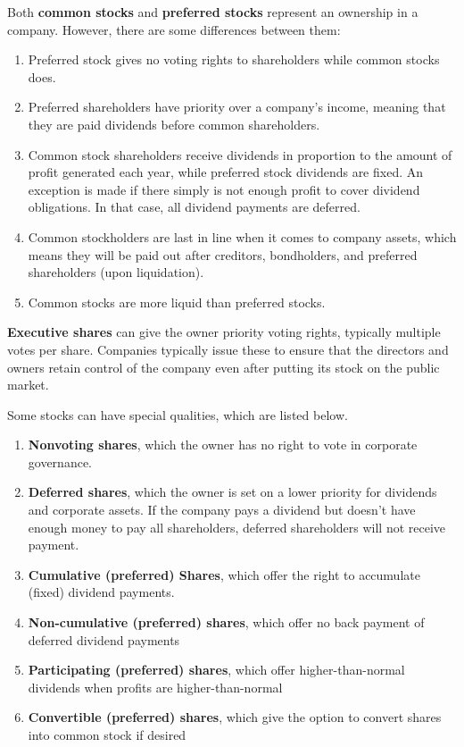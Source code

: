 \documentclass{article}
\begin{document}
  \begin{definition}
    Both \textbf{common stocks} and \textbf{preferred stocks} represent an ownership in a company. However, there are some differences between them: 
    \begin{enumerate}
      \item Preferred stock gives no voting rights to shareholders while common stocks does. 
      \item Preferred shareholders have priority over a company's income, meaning that they are paid dividends before common shareholders. 
      \item Common stock shareholders receive dividends in proportion to the amount of profit generated each year, while preferred stock dividends are fixed. An exception is made if there simply is not enough profit to cover dividend obligations. In that case, all dividend payments are deferred. 
      \item Common stockholders are last in line when it comes to company assets, which means they will be paid out after creditors, bondholders, and preferred shareholders (upon liquidation). 
      \item Common stocks are more liquid than preferred stocks. 
    \end{enumerate}
    \textbf{Executive shares} can give the owner priority voting rights, typically multiple votes per share. Companies typically issue these to ensure that the directors and owners retain control of the company even after putting its stock on the public market. 
  \end{definition}

  Some stocks can have special qualities, which are listed below. 
  \begin{enumerate}
    \item \textbf{Nonvoting shares}, which the owner has no right to vote in corporate governance. 
    \item \textbf{Deferred shares}, which the owner is set on a lower priority for dividends and corporate assets. If the company pays a dividend but doesn’t have enough money to pay all shareholders, deferred shareholders will not receive payment. 
    \item \textbf{Cumulative (preferred) Shares}, which offer the right to accumulate (fixed) dividend payments. 
    \item \textbf{Non-cumulative (preferred) shares}, which offer no back payment of deferred dividend payments
    \item \textbf{Participating (preferred) shares}, which offer higher-than-normal dividends when profits are higher-than-normal
    \item \textbf{Convertible (preferred) shares}, which give the option to convert shares into common stock if desired 
  \end{enumerate}
\end{document}
